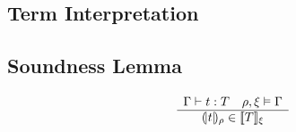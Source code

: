 \subsection{Term Interpretation}

\subsection{Soundness Lemma}

\begin{theorem}
  $$
  \begin{array}{c} \Gamma \vdash t : T
    \quad
    \rho,\xi \vDash \Gamma
   \\ \hline (\!|t|\!)_\rho \in [\![T]\!]_\xi\end{array}
  $$
\end{theorem}



